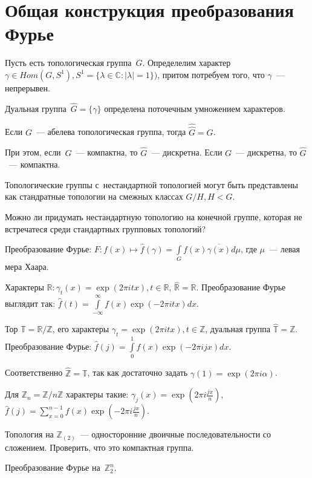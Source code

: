 \documentclass{article}
\begin{document}
\section{Общая конструкция преобразования Фурье}

Пусть есть топологическая группа~$G$. Определелим характер~$\gamma \in Hom(G,
S^1), S^1 = \{\lambda \in \mathbb{C} : |\lambda| = 1\})$, притом потребуем того,
что $\gamma$~--- непрерывен.

\begin{definition}
	Дуальная группа~$\hat G = \{\gamma\}$ определена поточечным умножением
	характеров.
\end{definition}

\begin{theorem}
Если $G$~--- абелева топологическая группа, тогда $\hat{\hat{G}} = G$.

При этом, если~$G$~--- компактна, то $\hat G$~--- дискретна. Если $G$~---
дискретна, то $\hat G$~--- компактна.
\end{theorem}

Топологические группы с~нестандартной топологией могут быть представлены как
стандратные топологии на смежных классах $G/H, H < G$.

\begin{exercise}
	Можно ли придумать нестандартную топологию на конечной группе, которая не
	встречатеся среди стандартных групповых топологий?
\end{exercise}

\begin{definition}
	Преобразование Фурье: $F: f(x) \mapsto \hat f(\gamma) = \int\limits_G
	f(x)\overline{\gamma(x)} d\mu$, где $\mu$~--- левая мера Хаара.
\end{definition}

Характеры $\mathbb{R}: \gamma_t(x) = \exp(2\pi itx), t \in \mathbb{R}$,
$\hat{\mathbb{R}} = \mathbb{R}$. Преобразование Фурье выглядит так:
$\hat f(t) = \int\limits_{-\infty}^{\infty} f(x) \exp(-2\pi itx) dx$.

Тор $\mathbb{T} = \mathbb{R} / \mathbb{Z}$, его характеры $\gamma_t = \exp(2\pi
itx), t \in \mathbb{Z}$, дуальная группа $\hat{\mathbb{T}} = \mathbb{Z}$.
Преобразование Фурье: $\hat f(j) = \int\limits_0^1 f(x) \exp(-2\pi ijx) dx$.

Соответственно $\hat{\mathbb{Z}} = \mathbb{T}$, так как достаточно задать
$\gamma(1) = \exp(2\pi i\alpha)$.

Для $\mathbb{Z}_n = \mathbb{Z} / n\mathbb{Z}$ характеры такие: $\gamma_j(x) =
\exp(2\pi i \frac{jx}{n})$, $\hat f(j) = \sum\limits_{x=0}^{n-1} f(x) \exp(-2\pi
i \frac{jx}{n})$.

\begin{exercise}
	Топология на $\mathbb{Z}_{(2)}$~--- односторонние двоичные последовательности
	со сложением. Проверить, что это компактная группа.
\end{exercise}
\begin{exercise}
	Преобразование Фурье на~$\mathbb{Z}_2^n$.
\end{exercise}
\end{document}
